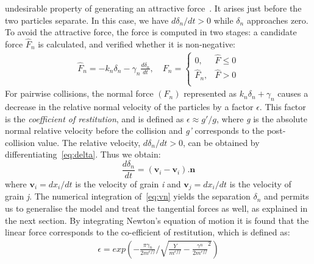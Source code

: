 undesirable property of generating an attractive force~\citep{Posch2005}. It 
arises just before 
the 
two particles separate. In this case, we have ${d{\delta_{n}}}$$/{dt} > 0$  
while $\delta_{n}$ 
approaches zero. To avoid the attractive force, the force is computed in two 
stages: a candidate 
force $\hat{F}_{n}$ is calculated, and verified whether it is non-negative:
\begin{align}
 {\hat{F}_{n}}=-{{k}_{n}}{{\delta}_{n}}-{{\gamma}_{n}}\frac{d{{\delta}_{n}}}{dt},
  \quad F_{n}=
\begin{cases}
0, & {\hat{F}} \le 0 \\
{\hat{F}}_{n}, & {\hat{F}} > 0 \\
\end{cases} \label{eq:nf}
\end{align} 
For pairwise collisions, the normal force $(F_{n})$ represented as 
${{k}_{n}}{{\delta}_{n}}+{{\gamma}_{n}}$ causes a decrease in the relative 
normal velocity of the 
particles by a factor $\epsilon$. This factor is the \textit{coefficient of 
restitution}, and is 
defined as $\epsilon\approx g'/g$, where \textit{g} is the absolute normal 
relative velocity 
before 
the collision and \textit{g'} corresponds to the post-collision value. The 
relative velocity, 
${d{\delta_{n}}}$$/{dt} > 0$, can be obtained by 
differentiating~\cref{eq:delta}. Thus we obtain:
\begin{equation}
\label{eq:vn}
\frac{d{\delta_{n}}}{dt}=(\mathbf{v}_{\mathit{i}}-\mathbf{v}_{\mathit{i}}).{\mathbf{n}}
\end{equation}
where $\mathbf{v}_{\mathit{i}}=dx_{\mathit{i}}/dt$ is the velocity of grain 
\textit{i} and 
$\mathbf{v}_{\mathit{j}}=dx_{\mathit{i}}/dt$ is the velocity of grain 
\textit{j}. The numerical 
integration of~\cref{eq:vn} yields the separation $\delta_{n}$ and permits us 
to generalise the 
model and treat the tangential forces as well, as explained in the next 
section. By integrating 
Newton's equation of motion it is found that the linear force corresponds to 
the co-efficient of 
restitution, which is defined as:
\begin{align}
\epsilon=exp(-\frac{\pi\gamma_{n}}{2m^{eff}}/\sqrt{\frac{Y}{m^{eff}}-{\frac{\gamma^{n}}{2m^{eff}}}^{2}})
\end{align}
% 


